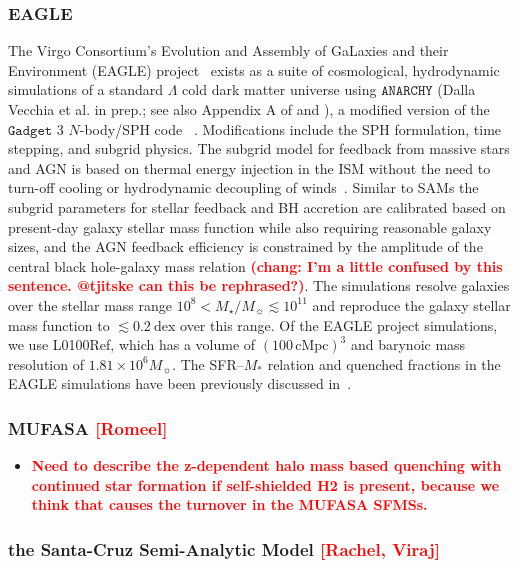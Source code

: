 \documentclass[preprint2,tighten]{aastex62}
\newcommand{\todo}[1]{{\bf \textcolor{red}{ #1}}}
\begin{document}
\subsubsection{EAGLE}
The Virgo Consortium's Evolution and Assembly of GaLaxies and their 
Environment (EAGLE) project~\citep{schaye2015, crain2015} exists as 
a suite of cosmological, hydrodynamic simulations of a standard 
$\Lambda$ cold dark matter universe using $\mathtt{ANARCHY}$ (Dalla 
Vecchia et al. in prep.; see also Appendix A of \citealt{schaye2015} and 
\citealt{schaller2015}), a modified version of the $\mathtt{Gadget}$ 3 
$N$-body/SPH code ~\citep{springel2005}. 
Modifications include the SPH formulation, time stepping, and subgrid 
physics. The subgrid model for feedback from massive stars and AGN is 
based on thermal energy injection in the ISM without the need to turn-off
cooling or hydrodynamic decoupling of winds~\citep{dallavecchia2012}. 
Similar to SAMs the subgrid parameters for stellar feedback and BH 
accretion are calibrated based on present-day galaxy 
stellar mass function while also requiring reasonable galaxy sizes, and 
the AGN feedback efficiency is constrained by the amplitude of the 
central black hole-galaxy mass relation \todo{(chang: I'm a little confused by this sentence. @tjitske can this be rephrased?)}. 
The simulations resolve galaxies over the stellar mass range 
$10^{8} < M_{\star}/M_{\sun} \lesssim 10^{11}$ and reproduce the galaxy 
stellar mass function to $\lesssim 0.2~\mathrm{dex}$ over this range. 
Of the EAGLE project simulations, we use L0100Ref, which has a volume 
of $(100\,\mathrm{cMpc})^3$ and barynoic mass resolution of 
$1.81\times 10^6M_{\sun}$. The SFR--$M_*$ relation and quenched fractions 
in the EAGLE simulations have been previously discussed 
in~\citet{furlong2015, trayford2015, trayford2017}. 

\subsubsection{MUFASA \todo{[Romeel]}}
\begin{itemize}
	\item \todo{Need to describe the z-dependent halo mass based quenching with continued star formation if self-shielded H2 is present, because we think that causes the turnover in the MUFASA SFMSs.}
\end{itemize}

\subsubsection{the Santa-Cruz Semi-Analytic Model \todo{[Rachel, Viraj]}}
\end{document}
